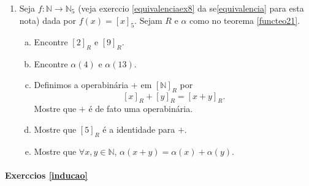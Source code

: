 \begin{enumerate}[{\bf 1.}]
\item Seja $f:\mathbb{N}\to\mathbb{N}_5$ (veja exerc\ih cio \ref{equivalenciaex8} da se\cao \ref{equivalencia} para esta nota\caoi) dada por $f(x)=[x]_5$. Sejam $R$ e $\alpha$ como no teorema \ref{functeo21}.
\begin{enumerate}[a)]
\item Encontre $[2]_R$ e $[9]_R$.
\item Encontre $\alpha(4)$ e $\alpha(13)$.
\item Definimos a opera\cao bin\'aria $+$ em $[\mathbb{N}]_R$ por
\[
[x]_R+[y]_R=[x+y]_R.
\]
Mostre que $+$ \'e de fato uma opera\cao bin\'aria.
\item Mostre que $[5]_R$ \'e a identidade para $+$.
\item Mostre que $\forall x,y\in \mathbb{N}$, $\alpha(x+y)=\alpha(x)+\alpha(y)$.
\end{enumerate}
\end{enumerate}

\paragraph{Exerc\ih cios \ref{inducao}}

